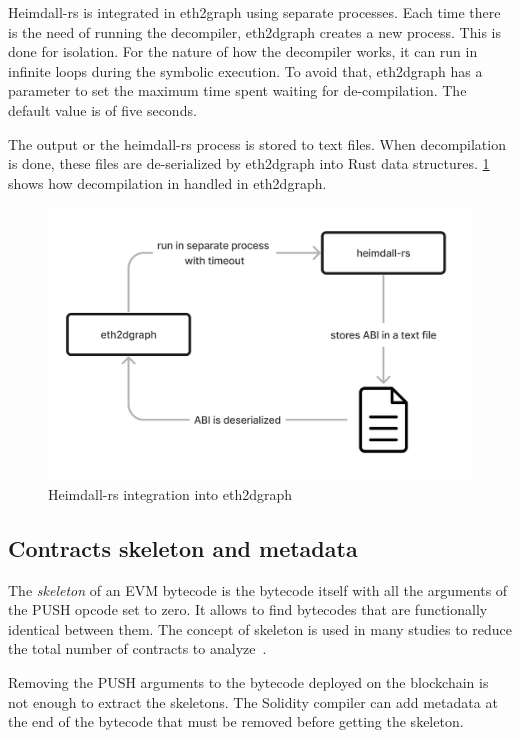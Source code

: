 Heimdall-rs is integrated in eth2graph using separate processes. Each time there is the need of running the decompiler, eth2dgraph creates a new process. This is done for isolation. For the nature of how the decompiler works, it can run in infinite loops during the symbolic execution. To avoid that, eth2dgraph has a parameter to set the maximum time spent waiting for de-compilation. The default value is of five seconds.

The output or the heimdall-rs process is stored to text files. When decompilation is done, these files are de-serialized by eth2dgraph into Rust data structures. \cref{fig:decompilation-architecture} shows how decompilation in handled in eth2dgraph.

\begin{figure}[H]
  \centering
  \includegraphics[width=1\textwidth]{Figures/methods/decompilation-architecture.jpg}
  \caption[Heimdall-rs integration into eth2dgraph]{Heimdall-rs integration into eth2dgraph}
  \label{fig:decompilation-architecture}
\end{figure}

\subsection{Contracts skeleton and metadata}

The \textit{skeleton} of an EVM bytecode is the bytecode itself with all the arguments of the PUSH opcode set to zero. It allows to find bytecodes that are functionally identical between them. The concept of skeleton is used in many studies to reduce the total number of contracts to analyze~\cite{token-contracts}\cite{wallet-contracts}.

Removing the PUSH arguments to the bytecode deployed on the blockchain is not enough to extract the skeletons. The Solidity compiler can add metadata at the end of the bytecode that must be removed before getting the skeleton.  

